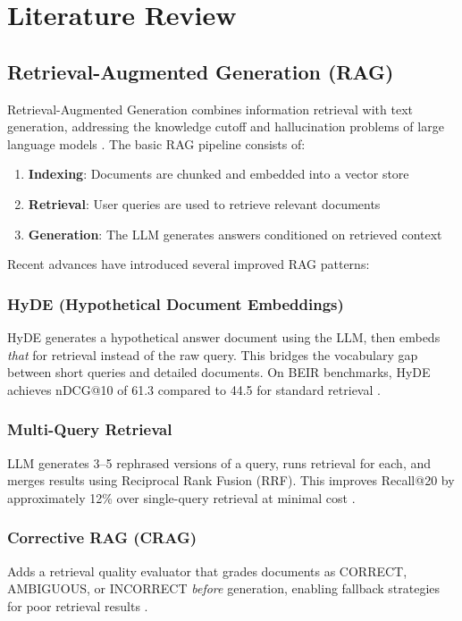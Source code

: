 \documentclass[12pt,a4paper]{article}
\begin{document}
\section{Literature Review}
\label{sec:literature}

\subsection{Retrieval-Augmented Generation (RAG)}

Retrieval-Augmented Generation combines information retrieval with text
generation, addressing the knowledge cutoff and hallucination problems of
large language models \cite{lewis2020rag}. The basic RAG pipeline consists of:
\begin{enumerate}
    \item \textbf{Indexing}: Documents are chunked and embedded into a vector
    store
    \item \textbf{Retrieval}: User queries are used to retrieve relevant
    documents
    \item \textbf{Generation}: The LLM generates answers conditioned on
    retrieved context
\end{enumerate}

Recent advances have introduced several improved RAG patterns:

\subsubsection{HyDE (Hypothetical Document Embeddings)}
HyDE generates a hypothetical answer document using the LLM, then embeds
\textit{that} for retrieval instead of the raw query. This bridges the
vocabulary gap between short queries and detailed documents. On BEIR
benchmarks, HyDE achieves nDCG@10 of 61.3 compared to 44.5 for standard
retrieval \cite{gao2023hyde}.

\subsubsection{Multi-Query Retrieval}
LLM generates 3--5 rephrased versions of a query, runs retrieval for each,
and merges results using Reciprocal Rank Fusion (RRF). This improves
Recall@20 by approximately 12\% over single-query retrieval at minimal cost
\cite{athavale2024multi}.

\subsubsection{Corrective RAG (CRAG)}
Adds a retrieval quality evaluator that grades documents as CORRECT,
AMBIGUOUS, or INCORRECT \textit{before} generation, enabling fallback
strategies for poor retrieval results \cite{yan2024crag}.
\end{document}
